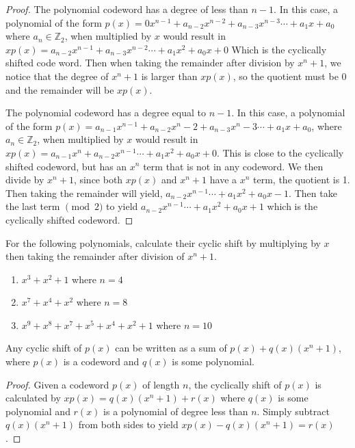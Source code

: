 \begin{proof}{}

The polynomial codeword has a degree of less than $n-1$. In this case, a polynomial of the form $p(x)= 0x^{n-1} + a_{n-2}x^{n-2} + a_{n-3}x^{n-3} \cdots + a_{1}x + a_0$ where $a_n \in \mathbb{Z}_2$, when multiplied by $x$ would result in $xp(x)=a_{n-2}x^{n-1} + a_{n-3}x^{n-2} \cdots + a_1x^2 + a_{0}x + 0$ Which is the cyclically shifted code word.  Then when taking the remainder after division by $x^n + 1$, we notice that the degree of $x^n + 1$ is larger than $xp(x)$, so the quotient must be 0 and the remainder will be $xp(x)$.

 
The polynomial codeword has a degree equal to $n-1$.  In this case, a polynomial of the form $p(x)= a_{n-1}x^{n-1} + a_{n-2}x^n-2 + a_{n-3}x^n-3 \cdots + a_{1}x + a_0$, where $a_n \in \mathbb{Z}_2$, when multiplied by $x$ would result in $xp(x)=a_{n-1}x^n + a_{n-2}x^{n-1} \cdots + a_1x^2 + a_{0}x + 0$.  This is close to the cyclically shifted codeword, but has an $x^n$ term that is not in any codeword.  We then divide by $x^n + 1$, since both $xp(x)$ and $x^n + 1$ have a $x^n$ term, the quotient is 1.  Then taking the remainder will yield, $a_{n-2}x^{n-1} \cdots + a_1x^2 + a_{0}x - 1$.  Then take the last term $\pmod2$ to yield $a_{n-2}x^{n-1} \cdots + a_1x^2 + a_{0}x + 1$ which is the cyclically shifted codeword.
\end{proof}

\begin{exercise} {}
For the following polynomials, calculate their cyclic shift by multiplying by $x$ then taking the remainder after division of $x^n + 1$.
\begin{enumerate}[a]
\item
$x^3 + x^2 + 1$ where $n=4$
\item
$x^7 + x^4 + x^2$ where $n=8$
\item
$x^9 + x^8 + x^7 + x^5 + x^4 +x^2 + 1$ where $n=10$
\end {enumerate}
\end {exercise}

\begin{prop}{}
Any cyclic shift of $p(x)$ can be written as a sum of $p(x) + q(x)(x^n + 1)$, where $p(x)$ is a codeword and $q(x)$ is some polynomial.  
\end {prop}

\begin{proof}
Given a codeword $p(x)$ of length $n$, the cyclically shift of $p(x)$ is calculated by $xp(x) = q(x)(x^n + 1) + r(x)$ where $q(x)$ is some polynomial and $r(x)$ is a polynomial of degree less than $n$.  Simply subtract $q(x)(x^n + 1)$ from both sides to yield $xp(x) - q(x)(x^n + 1) = r(x)$.
\end {proof}

